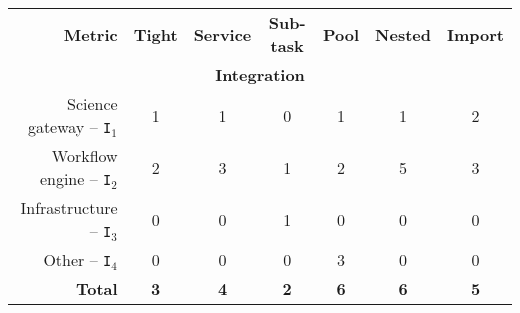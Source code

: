 \documentclass[preprint,3p,twocolumn]{elsarticle}
\begin{document}
\begin{table*}
\centering
\begin{tabular}{rcccccc}
\textbf{Metric}                      & \textbf{Tight}
                                     & \textbf{Service}
                                     & \textbf{Sub-task}
                                     & \textbf{Pool}
                                     & \textbf{Nested}
                                     & \textbf{Import} \\
\multicolumn{7}{c}{\cellcolor[HTML]{EEEEEE}\textbf{Integration}}\\
Science gateway -- \texttt{I$_1$}    & \cellcolor[HTML]{99FF99}1
                                     & \cellcolor[HTML]{99FF99}1
                                     & \cellcolor[HTML]{99FF99}0  
                                     & \cellcolor[HTML]{99FF99}1
                                     & \cellcolor[HTML]{99FF99}1
                                     & \cellcolor[HTML]{99AA99}2 \\
Workflow engine -- \texttt{I$_2$}    & \cellcolor[HTML]{99AA99}2
                                     & \cellcolor[HTML]{99FF99}3 
                                     & \cellcolor[HTML]{99FF99}1
                                     & \cellcolor[HTML]{99AA99}2
                                     & \cellcolor[HTML]{99AA99}5
                                     & \cellcolor[HTML]{99FF99}3 \\
Infrastructure -- \texttt{I$_3$}   & \cellcolor[HTML]{99FF99}0
                                     & \cellcolor[HTML]{99FF99}0
                                     & \cellcolor[HTML]{99FF99}1
                                     & \cellcolor[HTML]{99AA99}0
                                     & \cellcolor[HTML]{99AA99}0
                                     & \cellcolor[HTML]{99FF99}0 \\
Other -- \texttt{I$_4$}              & \cellcolor[HTML]{99FF99}0
                                     & \cellcolor[HTML]{99FF99}0
                                     & \cellcolor[HTML]{99FF99}0
                                     & \cellcolor[HTML]{99AA99}3
                                     & \cellcolor[HTML]{99AA99}0
                                     & \cellcolor[HTML]{99FF99}0 \\
\textbf{Total}                       & \cellcolor[HTML]{99FF99}\textbf{3}
                                     & \cellcolor[HTML]{99FF99}\textbf{4}
                                     & \cellcolor[HTML]{99FF99}\textbf{2}
                                     & \cellcolor[HTML]{99AA99}\textbf{6}
                                     & \cellcolor[HTML]{99AA99}\textbf{6}
                                     & \cellcolor[HTML]{99AA99}\textbf{5} \\


\end{tabular}
\end{table*}
\end{document}
